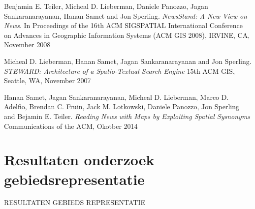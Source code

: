 \documentclass[twoside,openright]{uva-bachelor-thesis}
\begin{document}
\begin{thebibliography}{9}
	Benjamin E. Teiler, Micheal D. Lieberman, Daniele Panozzo, Jagan Sankaranarayanan, Hanan Samet and Jon Sperling.
	\textit{NewsStand: A New View on News}. 
	In Proceedings of the 16th ACM SIGSPATIAL International Conference on Advances in Geographic Information Systems (ACM GIS 2008), IRVINE, CA, November 2008
	
	Micheal D. Lieberman, Hanan Samet, Jagan Sankaranarayanan and Jon Sperling.
	\textit{STEWARD: Architecture of a Spatio-Textual Search Engine}
	15th ACM GIS, Seattle, WA, November 2007
	
	Hanan Samet, Jagan Sankaranarayanan, Micheal D. Lieberman, Marco D. Adelfio, Brendan C. Fruin, Jack M. Lotkowski, Daniele Panozzo, Jon Sperling and Bejamin E. Teiler.
	\textit{Reading News with Maps by Exploiting Spatial Sysnonyms}
	Communications of the ACM, Okotber 2014
\end{thebibliography}
\newpage
\appendix
\chapter{Resultaten onderzoek gebiedsrepresentatie}
\label{app:results_rep}
RESULTATEN GEBIEDS REPRESENTATIE
\end{document}
